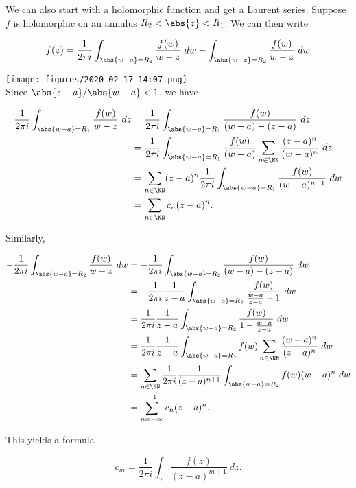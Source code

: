We can also start with a holomorphic function and get a Laurent series.
Suppose \(f\) is holomorphic on an annulus \(R_2 < \abs {z} < R_1\). We
can then write

\begin{align*}
f(z) = \frac 1 {2\pi i} \int_{\abs{w-a} = R_1} \frac{f(w)}{w-z} ~dw - \int_{\abs{w-z} = R_2} \frac{f(w)}{w-z} ~dw
\end{align*}

\texttt{[image: figures/2020-02-17-14:07.png]}\\

Since \(\abs{z-a}/\abs{w-a} < 1\), we have

\begin{align*}
\frac {1}{2\pi i} \int_{\abs{w-a} = R_1} \frac{f(w)}{w-z} ~dz 
&= \frac {1}{2\pi i} \int_{\abs{w-a} = R_1} \frac{f(w)}{(w-a) - (z-a)} ~dz \\
&= \frac {1}{2\pi i} \int_{\abs{w-a} = R_1} \frac{f(w)}{(w-a)} \sum_{n\in \NN} \frac{(z-a)^n}{(w-a)^n} ~dz \\
&= \sum_{n\in \NN} (z-a)^n \frac 1 {2\pi i} \int_{\abs{w-a} = R_1} \frac{f(w)}{(w-a)^{n+1}} ~dw \\
&= \sum_{n\in \NN} c_n (z-a)^n
.\end{align*}

Similarly,

\begin{align*}
-\frac 1 {2\pi i} \int_{\abs{w-a} = R_2}  \frac{f(w)}{w-z} ~dw  
&= -\frac 1 {2\pi i} \int_{\abs{w-a} = R_2} \frac{f(w)}{(w-a) - (z-a)} ~dw  \\ 
&= -\frac 1 {2\pi i} \frac {1}{z-a} \int_{\abs{w-a} = R_2} \frac {f(w)} {\frac{w-a}{z-a} - 1} ~dw  \\
&= \frac 1 {2\pi i} \frac {1}{z-a} \int_{\abs{w-a} = R_2}  \frac{f(w)} {1 - \frac{w-a}{z-a} } ~dw  \\
&= \frac 1 {2\pi i} \frac {1}{z-a} \int_{\abs{w-a} = R_2} f(w) \sum_{n\in \NN} \frac{(w-a)^n}{(z-a)^n} ~dw \\
&= \sum_{n\in\NN} \frac 1 {2\pi i} \frac {1}{(z-a)^{n+1}} \int_{\abs{w-a} = R_2} f(w) (w-a)^n ~dw  \\ 
&= \sum_{n=-\infty}^{-1} c_n (z-a)^n
.\end{align*}

This yields a formula

\begin{equation}
c_m = \frac {1}{2\pi i} \int_\gamma \frac{f(z)}{(z-a)^{m+1}} ~dz
.\end{equation}

